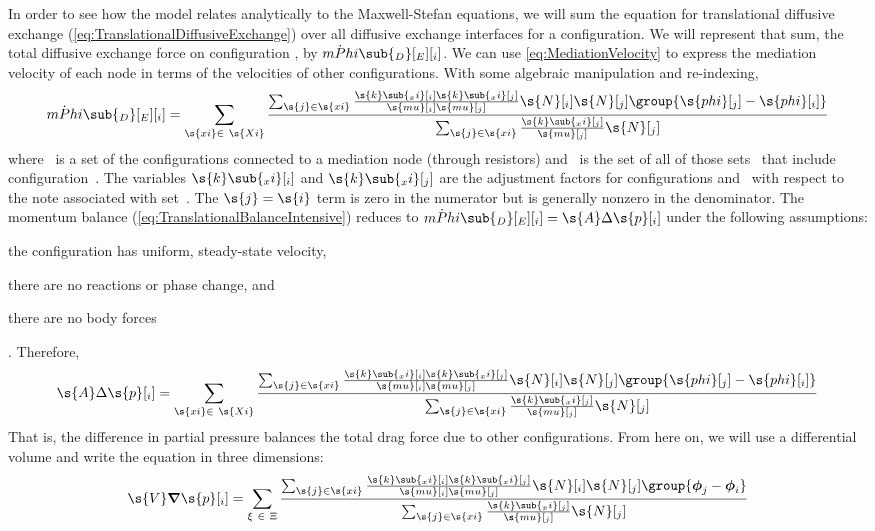 In order to see how the model relates analytically to the Maxwell-Stefan equations, we will sum the equation for translational diffusive exchange (\ref{eq:TranslationalDiffusiveExchange}) over all diffusive exchange interfaces for a configuration.  We will represent that sum, the total diffusive exchange force on configuration , by $\dot{mPhi}\sub{_D}[_E][_i]$.  We can use \autoref{eq:MediationVelocity} to express the mediation velocity of each node in terms of the velocities of other configurations.  With some algebraic manipulation and re-indexing,
\begin{equation}
  \dot{mPhi}\sub{_D}[_E][_i] = \sum_{\s{xi} \in~\s{Xi}}\frac{\sum_{\s{j} \in \s{xi}}\frac{\s{k}\sub{_xi}[_i]\s{k}\sub{_xi}[_j]}{\s{mu}[_i]\s{mu}[_j]}\s{N}[_i]\s{N}[_j]\group{\s{phi}[_j] - \s{phi}[_i]}}{\sum_{\s{j} \in \s{xi}}\frac{\s{k}\sub{_xi}[_j]}{\s{mu}[_j]}\s{N}[_j]}
\end{equation}
where ~is a set of the configurations connected to a mediation node (through resistors) and ~is the set of all of those sets~ that include configuration~.  The variables $\s{k}\sub{_xi}[_i]$ and $\s{k}\sub{_xi}[_j]$ are the adjustment factors for configurations  and~ with respect to the note associated with set~.  The $\s{j} = \s{i}$ term is zero in the numerator but is generally nonzero in the denominator.  The momentum balance (\autoref{eq:TranslationalBalanceIntensive}) reduces to $\dot{mPhi}\sub{_D}[_E][_i] = \s{A}\Delta\s{p}[_i]$ under the following assumptions: \begin{inparaenum}[(1)]\item the configuration has uniform, steady-state velocity, \item there are no reactions or phase change, and \item there are no body forces\end{inparaenum}.  Therefore,
\begin{equation}
  \s{A}\Delta\s{p}[_i] = \sum_{\s{xi} \in~\s{Xi}}\frac{\sum_{\s{j} \in \s{xi}}\frac{\s{k}\sub{_xi}[_i]\s{k}\sub{_xi}[_j]}{\s{mu}[_i]\s{mu}[_j]}\s{N}[_i]\s{N}[_j]\group{\s{phi}[_j] - \s{phi}[_i]}}{\sum_{\s{j} \in \s{xi}}\frac{\s{k}\sub{_xi}[_j]}{\s{mu}[_j]}\s{N}[_j]}
\end{equation}
That is, the difference in partial pressure balances the total drag force due to other configurations.  From here on, we will use a differential volume and write the equation in three dimensions:
\begin{equation}
  \label{eq:MSDerivationStep3}
  \s{V}\boldsymbol{\nabla}\s{p}[_i] = \sum_{\xi ~\in~\Xi}\frac{\sum_{\s{j} \in \s{xi}}\frac{\s{k}\sub{_xi}[_i]\s{k}\sub{_xi}[_j]}{\s{mu}[_i]\s{mu}[_j]}\s{N}[_i]\s{N}[_j]\group{\boldsymbol{\phi}_j - \boldsymbol{\phi}_i}}{\sum_{\s{j} \in \s{xi}}\frac{\s{k}\sub{_xi}[_j]}{\s{mu}[_j]}\s{N}[_j]}
\end{equation}

